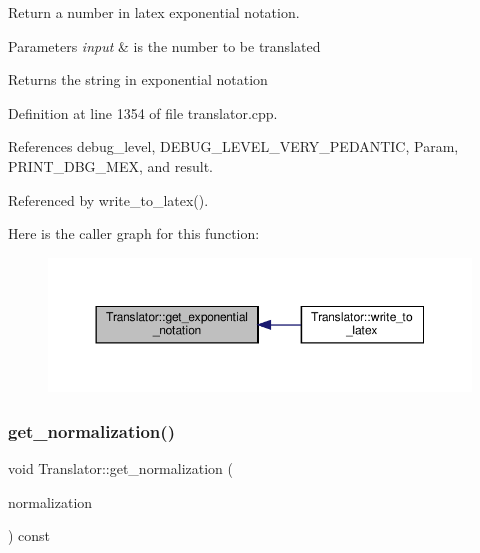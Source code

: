 Return a number in latex exponential notation. 


\begin{DoxyParams}{Parameters}
{\em input} & is the number to be translated \\
\hline
\end{DoxyParams}
\begin{DoxyReturn}{Returns}
the string in exponential notation 
\end{DoxyReturn}


Definition at line 1354 of file translator.\+cpp.



References debug\+\_\+level, D\+E\+B\+U\+G\+\_\+\+L\+E\+V\+E\+L\+\_\+\+V\+E\+R\+Y\+\_\+\+P\+E\+D\+A\+N\+T\+IC, Param, P\+R\+I\+N\+T\+\_\+\+D\+B\+G\+\_\+\+M\+EX, and result.



Referenced by write\+\_\+to\+\_\+latex().

Here is the caller graph for this function\+:
\nopagebreak
\begin{figure}[H]
\begin{center}
\leavevmode
\includegraphics[width=350pt]{d4/dee/classTranslator_a144c5be44c22ad4a4114b4302eb19742_icgraph}
\end{center}
\end{figure}
\mbox{\label{classTranslator_ab7c4afcf6779d0d8591e6b79a139e6ae}} 
\subsubsection{\texorpdfstring{get\+\_\+normalization()}{get\_normalization()}}
{\footnotesize\ttfamily void Translator\+::get\+\_\+normalization (\begin{DoxyParamCaption}\item[{\hyperlink{custom__map_8hpp_ad1ed68f2ff093683ab1a33522b144adc}{Custom\+Unordered\+Map}$<$ std\+::string, long double $>$ \&}]{normalization }\end{DoxyParamCaption}) const\hspace{0.3cm}{\ttfamily [private]}}



